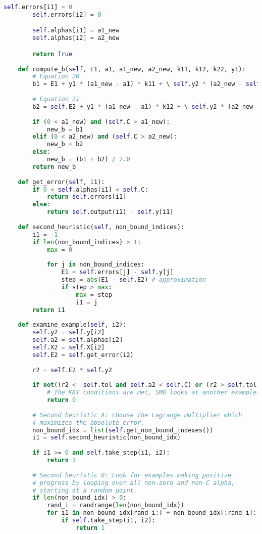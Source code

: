 \begin{lstlisting}[language=python]
        self.errors[i1] = 0 
        self.errors[i2] = 0 

        self.alphas[i1] = a1_new 
        self.alphas[i2] = a2_new

        return True 
    
    def compute_b(self, E1, a1, a1_new, a2_new, k11, k12, k22, y1): 
        # Equation 20 
        b1 = E1 + y1 * (a1_new - a1) * k11 + \ self.y2 * (a2_new - self.a2) * k12 + self.b 
        
        # Equation 21 
        b2 = self.E2 + y1 * (a1_new - a1) * k12 + \ self.y2 * (a2_new - self.a2) * k22 + self.b 
        
        if (0 < a1_new) and (self.C > a1_new): 
            new_b = b1 
        elif (0 < a2_new) and (self.C > a2_new): 
            new_b = b2 
        else: 
            new_b = (b1 + b2) / 2.0 
        return new_b 
    
    def get_error(self, i1): 
        if 0 < self.alphas[i1] < self.C: 
            return self.errors[i1] 
        else: 
            return self.output(i1) - self.y[i1] 
            
    def second_heuristic(self, non_bound_indices): 
        i1 = -1 
        if len(non_bound_indices) > 1: 
            max = 0 
            
            for j in non_bound_indices: 
                E1 = self.errors[j] - self.y[j] 
                step = abs(E1 - self.E2) # approximation 
                if step > max: 
                    max = step 
                    i1 = j 
        return i1 
        
    def examine_example(self, i2): 
        self.y2 = self.y[i2] 
        self.a2 = self.alphas[i2] 
        self.X2 = self.X[i2] 
        self.E2 = self.get_error(i2) 
        
        r2 = self.E2 * self.y2 
        
        if not((r2 < -self.tol and self.a2 < self.C) or (r2 > self.tol and self.a2 > 0)):
            # The KKT conditions are met, SMO looks at another example. 
            return 0 
        
        # Second heuristic A: choose the Lagrange multiplier which 
        # maximizes the absolute error. 
        non_bound_idx = list(self.get_non_bound_indexes()) 
        i1 = self.second_heuristic(non_bound_idx) 
        
        if i1 >= 0 and self.take_step(i1, i2): 
            return 1 
            
        # Second heuristic B: Look for examples making positive 
        # progress by looping over all non-zero and non-C alpha, 
        # starting at a random point. 
        if len(non_bound_idx) > 0: 
            rand_i = randrange(len(non_bound_idx)) 
            for i1 in non_bound_idx[rand_i:] + non_bound_idx[:rand_i]: 
                if self.take_step(i1, i2): 
                    return 1 
                    

\end{lstlisting}
